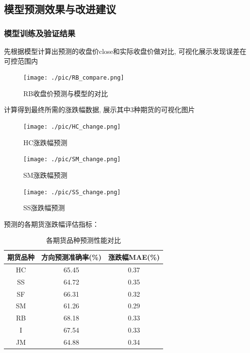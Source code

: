 \documentclass[a4paper,11pt]{ctexart}
\begin{document}
\subsection{模型预测效果与改进建议}
\subsubsection{模型训练及验证结果}
先根据模型计算出预测的收盘价close和实际收盘价做对比, 可视化展示发现误差在可控范围内
\begin{figure}[H]
  \centering
  \texttt{[image: ./pic/RB\_compare.png]}
  \caption*{RB收盘价预测与模型的对比}
\end{figure}

计算得到最终所需的涨跌幅数据, 展示其中3种期货的可视化图片
\FloatBarrier
\noindent
\begin{figure}[H]
  \centering
  \texttt{[image: ./pic/HC\_change.png]}
  \caption*{HC涨跌幅预测}
\end{figure}
\begin{figure}[H]
  \centering
  \texttt{[image: ./pic/SM\_change.png]}
  \caption*{SM涨跌幅预测}
\end{figure}
\begin{figure}[H]
  \centering
  \texttt{[image: ./pic/SS\_change.png]}
  \caption*{SS涨跌幅预测}
\end{figure}



预测的各期货涨跌幅评估指标：
\begin{table}[H]
  \centering
  \caption{各期货品种预测性能对比}
  \begin{tabular}{|c|c|c|} 
    \hline
    \textbf{期货品种} & \textbf{方向预测准确率(\%)} & \textbf{涨跌幅MAE(\%)} \\
    \hline
    HC & 65.45 & 0.37 \\
    \hline
    SS & 64.72 & 0.35 \\
    \hline
    SF & 66.31 & 0.32 \\
    \hline
    SM & 61.26 & 0.29 \\
    \hline
    RB & 68.18 & 0.33 \\
    \hline
    I & 67.54 & 0.33 \\
    \hline
    JM & 64.88 & 0.34 \\
    \hline
  \end{tabular}
  \label{tab:prediction_performance}
\end{table}
\end{document}
